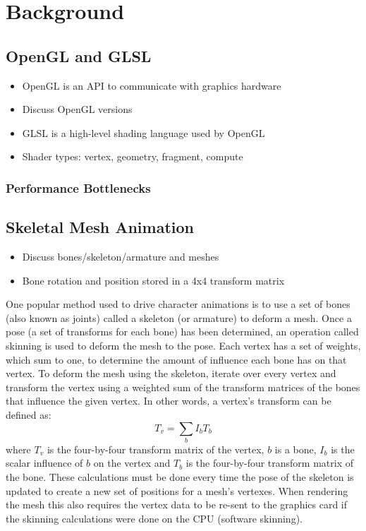 \section{Background}

\subsection{OpenGL and GLSL}
\ifsummaries
\begin{itemize}
 \item OpenGL is an API to communicate with graphics hardware
 \item Discuss OpenGL versions
 \item GLSL is a high-level shading language used by OpenGL
 \item Shader types: vertex, geometry, fragment, compute
\end{itemize}
\fi


\subsubsection{Performance Bottlenecks}


\subsection{Skeletal Mesh Animation}
\ifsummaries
\begin{itemize}
 \item Discuss bones/skeleton/armature and meshes
 \item Bone rotation and position stored in a 4x4 transform matrix
\end{itemize}
\fi

One popular method used to drive character animations is to use a set of bones (also known as joints) called a skeleton (or armature) to deform a mesh.
Once a pose (a set of transforms for each bone) has been determined, an operation called skinning is used to deform the mesh to the pose.
Each vertex has a set of weights, which sum to one, to determine the amount of influence each bone has on that vertex.
To deform the mesh using the skeleton, iterate over every vertex and transform the vertex using a weighted sum of the transform matrices of the bones that influence the given vertex.
In other words, a vertex's transform can be defined as:\[T_v = \sum_b{I_bT_b}\]
where $T_v$ is the four-by-four transform matrix of the vertex, $b$ is a bone, $I_b$ is the scalar influence of $b$ on the vertex and $T_b$ is the four-by-four transform matrix of the bone.
These calculations must be done every time the pose of the skeleton is updated to create a new set of positions for a mesh's vertexes.
When rendering the mesh this also requires the vertex data to be re-sent to the graphics card if the skinning calculations were done on the CPU (software skinning).

